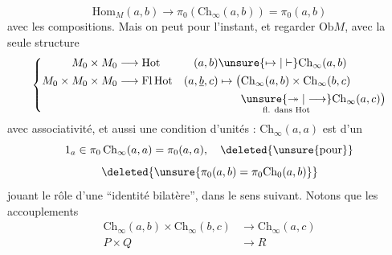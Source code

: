 \[
\mathrm{Hom}_M(a,b)\longrightarrow\pi_0(\mathrm{Ch}_{\infty}(a,b))=\pi_0(a,b)
\]
 avec les compositions. Mais on peut  pour l'instant, et regarder $\mathrm{Ob}M$,  avec la seule structure
\[
\left\{\begin{aligned}
M_0\times M_0&\longrightarrow\mathrm{Hot}&(a,b)&\unsure{\mapsto|\vdash}\mathrm{Ch}_{\infty}(a,b)\\
M_0\times M_0\times M_0&\longrightarrow\mathrm{Fl}\,\mathrm{Hot}&(a,\underline b,c)&\mapsto\bigl(\mathrm{Ch}_{\infty}(a,b)\times\mathrm{Ch}_{\infty}(b,c)\\
&&&\hspace{2em}\underset{\text{fl. dans Hot}}{\unsure{\twoheadrightarrow|\longrightarrow}}\mathrm{Ch}_{\infty}(a,c)\bigr)
\end{aligned}\right.
\]
avec  associativité, et aussi une condition d'unités : $\mathrm{Ch}_{\infty}(a,a)$ est  d'un
\[
1_a\in\pi_0\,\mathrm{Ch}_{\infty}(a,a)=\pi_0(a,a),\quad\deleted{\unsure{\text{pour}}}
\]
\[
\deleted{\unsure{\pi_0(a,b)=\pi_0\mathrm{Ch}_0(a,b)}}
\]
jouant le rôle d'une ``identité bilatère'', dans le sens suivant. Notons que les accouplements
\[
\begin{aligned}
\mathrm{Ch}_{\infty}(a,b)\times\mathrm{Ch}_{\infty}(b,c)&\longrightarrow\mathrm{Ch}_{\infty}(a,c)\\
P\times Q&\longrightarrow R
\end{aligned}
\]

